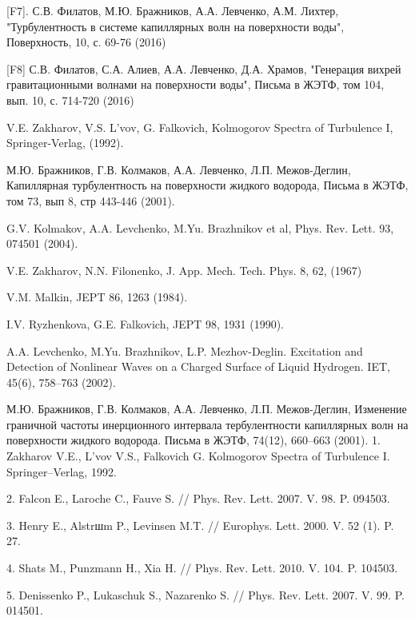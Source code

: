 [F7]. С.В. Филатов, М.Ю. Бражников, А.А. Левченко,  А.М. Лихтер, "Турбулентность в системе капиллярных волн на поверхности воды", Поверхность, 10, с. 69-76 (2016)

[F8] С.В. Филатов, С.А. Алиев, А.А. Левченко, Д.А. Храмов, "Генерация вихрей гравитационными волнами на поверхности воды", Письма в ЖЭТФ, том 104, вып.  10, с. 714-720 (2016)


\begin{thebibliography}{99}

V.E. Zakharov, V.S. L'vov, G. Falkovich, Kolmogorov Spectra of Turbulence I, Springer-Verlag, (1992).

М.Ю. Бражников, Г.В. Колмаков, А.А. Левченко, Л.П. Межов-Деглин, Капиллярная турбулентность на поверхности жидкого водорода, Письма в ЖЭТФ, том 73, вып 8, стр 443-446 (2001).
 
G.V. Kolmakov, A.A. Levchenko, M.Yu. Brazhnikov et al, Phys. Rev. Lett. 93, 074501 (2004).

V.E. Zakharov, N.N. Filonenko, J. App. Mech. Tech. Phys. 8, 62, (1967)

V.M. Malkin, JEPT 86, 1263 (1984).

I.V. Ryzhenkova, G.E. Falkovich, JEPT 98, 1931 (1990).

A.A. Levchenko, M.Yu. Brazhnikov, L.P. Mezhov-Deglin. Excitation and Detection of Nonlinear Waves on a Charged Surface of Liquid Hydrogen. IET, 45(6), 758–763 (2002).

М.Ю. Бражников, Г.В. Колмаков, А.А. Левченко, Л.П. Межов-Деглин, Изменение граничной частоты инерционного интервала тербулентности капиллярных волн на поверхности жидкого водорода. Письма в ЖЭТФ, 74(12), 660–663 (2001).
1. Zakharov V.E., L’vov V.S., Falkovich G. Kolmogorov Spectra of Turbulence I. Springer–Verlag, 1992.

2. Falcon E., Laroche C., Fauve S. // Phys. Rev. Lett. 2007. V. 98. P. 094503.

3. Henry E., Alstrшm P., Levinsen M.T. // Europhys. Lett. 2000. V. 52 (1). P. 27.

4. Shats M., Punzmann H., Xia H. // Phys. Rev. Lett. 2010. V. 104. P. 104503.

5. Denissenko P., Lukaschuk S., Nazarenko S. // Phys. Rev. Lett. 2007. V. 99. P. 014501.


\end{thebibliography}
